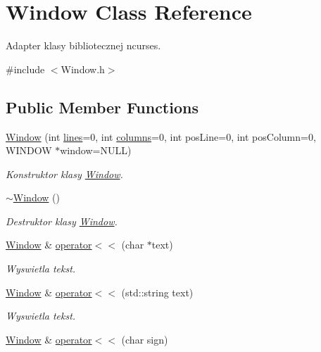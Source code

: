 \hypertarget{class_window}{}\section{Window Class Reference}
\label{class_window}


Adapter klasy bibliotecznej ncurses.  




{\ttfamily \#include $<$Window.\+h$>$}

\subsection*{Public Member Functions}
\begin{DoxyCompactItemize}
\item 
\hyperlink{class_window_aec537c1c6aa1855eb41444fc67b6b362}{Window} (int \hyperlink{class_window_a2d89f391164858a8e53d301f247873dd}{lines}=0, int \hyperlink{class_window_a9df6358fb547f10baa070fc811995ba7}{columns}=0, int pos\+Line=0, int pos\+Column=0, W\+I\+N\+D\+O\+W $\ast$window=N\+U\+L\+L)
\begin{DoxyCompactList}\small\item\em Konstruktor klasy \hyperlink{class_window}{Window}. \end{DoxyCompactList}\item 
\hyperlink{class_window_a245d821e6016fa1f6970ccbbedd635f6}{$\sim$\+Window} ()
\begin{DoxyCompactList}\small\item\em Destruktor klasy \hyperlink{class_window}{Window}. \end{DoxyCompactList}\item 
\hyperlink{class_window}{Window} \& \hyperlink{class_window_a60f74654f00a5c9688295c8ec0d18126}{operator$<$$<$} (char $\ast$text)
\begin{DoxyCompactList}\small\item\em Wyswietla tekst. \end{DoxyCompactList}\item 
\hyperlink{class_window}{Window} \& \hyperlink{class_window_ac8de224c4fc4e781879b464f8606f804}{operator$<$$<$} (std\+::string text)
\begin{DoxyCompactList}\small\item\em Wyswietla tekst. \end{DoxyCompactList}\item 
\hyperlink{class_window}{Window} \& \hyperlink{class_window_a76fd2af7fc113d29f5488a7a629115d8}{operator$<$$<$} (char sign)

\end{DoxyCompactItemize}

